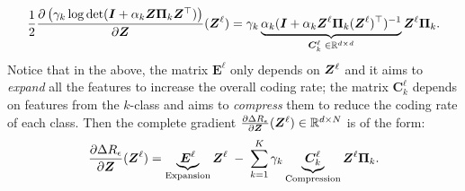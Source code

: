 \documentclass[../../book-main.tex]{subfiles}
\begin{document}
\begin{equation}\label{eqn:compress-directions}
\frac{1}{2}\frac{\partial \left( \gamma_{k}  \log \det (\bm{I} + \alpha_{k} \bm{Z} \bm \Pi_k \bm{Z}^{\top} )  \right)}{\partial \bm Z}(\bm{Z}^\ell) = \gamma_{k}  \underbrace{ \alpha_{k}  (\bm{I} +  \alpha_{k} \bm{Z}^\ell \bm \Pi_k (\bm{Z}^\ell)^{\top})^{-1}}_{\bm C^{\ell}_k \; \in \mathbb{R}^{d\times d}} \bm{Z}^{\ell} \bm \Pi_k.
\end{equation}
Notice that in the above, the matrix $\bm E^{\ell}$  only depends on $\bm{Z}^{\ell}$ and it aims to {\em expand} all the features to increase the overall coding rate; the matrix $\bm C^{\ell}_{k}$ depends on features from the $k$-class and aims to {\em compress} them to reduce the coding rate of each class. 
Then the complete gradient $\frac{\partial \Delta R_{\epsilon}}{\partial \bm Z}(\bm{Z}^\ell) \in \mathbb{R}^{d\times N}$ is of the  form:
\begin{equation}
\frac{\partial \Delta R_{\epsilon}}{\partial \bm Z}(\bm{Z}^\ell)  = \underbrace{\bm E^{\ell}}_{\text{Expansion}} \bm{Z}^{\ell} \;-\; \sum_{k=1}^K \gamma_{k} \underbrace{\bm C_{k}^{\ell}}_{\text{Compression}}  \bm{Z}^{\ell} \bm{\Pi}_k.
\label{eqn:DR-gradient}
\end{equation}
\end{document}
